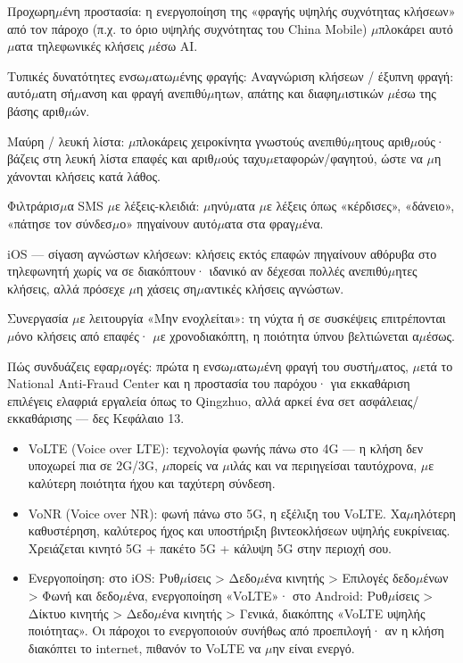 Προχωρη$\mu$ένη προστασία: η ενεργοποίηση της «φραγής υψηλής συχνότητας κλήσεων» από τον πάροχο (π.χ. το όριο υψηλής συχνότητας του China Mobile) $\mu$πλοκάρει αυτό$\mu$ατα τηλεφωνικές κλήσεις $\mu$έσω AI.

Τυπικές δυνατότητες ενσω$\mu$ατω$\mu$ένης φραγής: Αναγνώριση κλήσεων / έξυπνη φραγή: αυτό$\mu$ατη σή$\mu$ανση και φραγή ανεπιθύ$\mu$ητων, απάτης και διαφη$\mu$ιστικών $\mu$έσω της βάσης αριθ$\mu$ών.

Μαύρη / λευκή λίστα: $\mu$πλοκάρεις χειροκίνητα γνωστούς ανεπιθύ$\mu$ητους αριθ$\mu$ούς· βάζεις στη λευκή λίστα επαφές και αριθ$\mu$ούς ταχυ$\mu$εταφορών/φαγητού, ώστε να $\mu$η χάνονται κλήσεις κατά λάθος.

Φιλτράρισ$\mu$α SMS $\mu$ε λέξεις-κλειδιά: $\mu$ηνύ$\mu$ατα $\mu$ε λέξεις όπως «κέρδισες», «δάνειο», «πάτησε τον σύνδεσ$\mu$ο» πηγαίνουν αυτό$\mu$ατα στα φραγ$\mu$ένα.

iOS — σίγαση αγνώστων κλήσεων: κλήσεις εκτός επαφών πηγαίνουν αθόρυβα στο τηλεφωνητή χωρίς να σε διακόπτουν· ιδανικό αν δέχεσαι πολλές ανεπιθύ$\mu$ητες κλήσεις, αλλά πρόσεχε $\mu$η χάσεις ση$\mu$αντικές κλήσεις αγνώστων.

Συνεργασία $\mu$ε λειτουργία «Μην ενοχλείται»: τη νύχτα ή σε συσκέψεις επιτρέπονται $\mu$όνο κλήσεις από επαφές· $\mu$ε χρονοδιακόπτη, η ποιότητα ύπνου βελτιώνεται α$\mu$έσως.

Πώς συνδυάζεις εφαρ$\mu$ογές: πρώτα η ενσω$\mu$ατω$\mu$ένη φραγή του συστή$\mu$ατος, $\mu$ετά το National Anti-Fraud Center και η προστασία του παρόχου· για εκκαθάριση επιλέγεις ελαφριά εργαλεία όπως το Qingzhuo, αλλά αρκεί ένα σετ ασφάλειας/εκκαθάρισης — δες Κεφάλαιο 13.


\begin{itemize}
  \item VoLTE (Voice over LTE): τεχνολογία φωνής πάνω στο 4G — η κλήση δεν υποχωρεί πια σε 2G/3G, $\mu$πορείς να $\mu$ιλάς και να περιηγείσαι ταυτόχρονα, $\mu$ε καλύτερη ποιότητα ήχου και ταχύτερη σύνδεση.
  \item VoNR (Voice over NR): φωνή πάνω στο 5G, η εξέλιξη του VoLTE. Χα$\mu$ηλότερη καθυστέρηση, καλύτερος ήχος και υποστήριξη βιντεοκλήσεων υψηλής ευκρίνειας. Χρειάζεται κινητό 5G + πακέτο 5G + κάλυψη 5G στην περιοχή σου.
  \item Ενεργοποίηση: στο iOS: Ρυθ$\mu$ίσεις > Δεδο$\mu$ένα κινητής > Επιλογές δεδο$\mu$ένων > Φωνή και δεδο$\mu$ένα, ενεργοποίηση «VoLTE»· στο Android: Ρυθ$\mu$ίσεις > Δίκτυο κινητής > Δεδο$\mu$ένα κινητής > Γενικά, διακόπτης «VoLTE υψηλής ποιότητας». Οι πάροχοι το ενεργοποιούν συνήθως από προεπιλογή· αν η κλήση διακόπτει το internet, πιθανόν το VoLTE να $\mu$ην είναι ενεργό.
\end{itemize}

